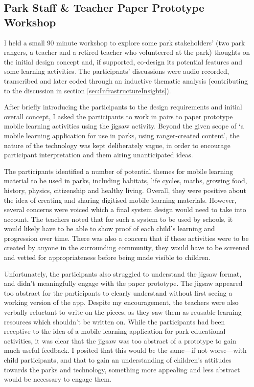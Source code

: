 \subsection{Park Staff \& Teacher Paper Prototype Workshop}
\label{sec:PrototypeWorkshop}

I held a small 90 minute workshop to explore some park stakeholders’ (two park rangers, a teacher and a retired teacher who volunteered at the park) thoughts on the initial design concept and, if supported, co-design its potential features and some learning activities. The participants' discussions were audio recorded, transcribed and later coded through an inductive thematic analysis (contributing to the discussion in section \ref{sec:InfrastructureInsights}).

After briefly introducing the participants to the design requirements and initial overall concept, I asked the participants to work in pairs to paper prototype mobile learning activities using the jigsaw activity. Beyond the given scope of `a mobile learning application for use in parks, using ranger-created content', the nature of the technology was kept deliberately vague, in order to encourage participant interpretation and them airing unanticipated ideas.

The participants identified a number of potential themes for mobile learning material to be used in parks, including habitats, life cycles, maths, growing food, history, physics, citizenship and healthy living. Overall, they were positive about the idea of creating and sharing digitised mobile learning materials. However, several concerns were voiced which a final system design would need to take into account. The teachers noted that for such a system to be used by schools, it would likely have to be able to show proof of each child’s learning and progression over time. There was also a concern that if these activities were to be created by anyone in the surrounding community, they would have to be screened and vetted for appropriateness before being made visible to children.

Unfortunately, the participants also struggled to understand the jigsaw format, and didn't meaningfully engage with the paper prototype. The jigsaw appeared too abstract for the participants to clearly understand without first seeing a working version of the app. Despite my encouragement, the teachers were also verbally reluctant to write on the pieces, as they saw them as reusable learning resources which shouldn't be written on. While the participants had been receptive to the idea of a mobile learning application for park educational activities, it was clear that the jigsaw was too abstract of a prototype to gain much useful feedback. I posited that this would be the same---if not worse---with child participants, and that to gain an understanding of children’s attitudes towards the parks and technology, something more appealing and less abstract would be necessary to engage them. 

